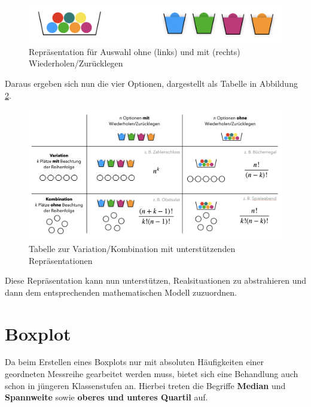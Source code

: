 \documentclass[
]{scrbook}
\theoremstyle{definition}
\theoremstyle{definition}
\theoremstyle{definition}
\theoremstyle{definition}
\theoremstyle{remark}
\begin{document}
\begin{figure}

{\centering \includegraphics[width=0.75\linewidth]{pictures/12-Wiederholung} 

}

\caption{Repräsentation für Auswahl ohne (links) und mit (rechts) Wiederholen/Zurücklegen}\label{fig:Wiederholung}
\end{figure}

Daraus ergeben sich nun die vier Optionen, dargestellt als Tabelle in Abbildung \ref{fig:Kombinatorik}.

\begin{figure}

{\centering \includegraphics[width=0.95\linewidth]{pictures/12-Kombinatorik} 

}

\caption{Tabelle zur Variation/Kombination mit unterstützenden Repräsentationen}\label{fig:Kombinatorik}
\end{figure}

Diese Repräsentation kann nun unterstützen, Realsituationen zu abstrahieren und dann dem entsprechenden mathematischen Modell zuzuordnen.

\section{Boxplot}\label{boxplot}

Da beim Erstellen eines Boxplots nur mit absoluten Häufigkeiten einer geordneten Messreihe gearbeitet werden muss, bietet sich eine Behandlung auch schon in jüngeren Klassenstufen an. Hierbei treten die Begriffe \textbf{Median} und \textbf{Spannweite} sowie \textbf{oberes und unteres Quartil} auf.
\end{document}
